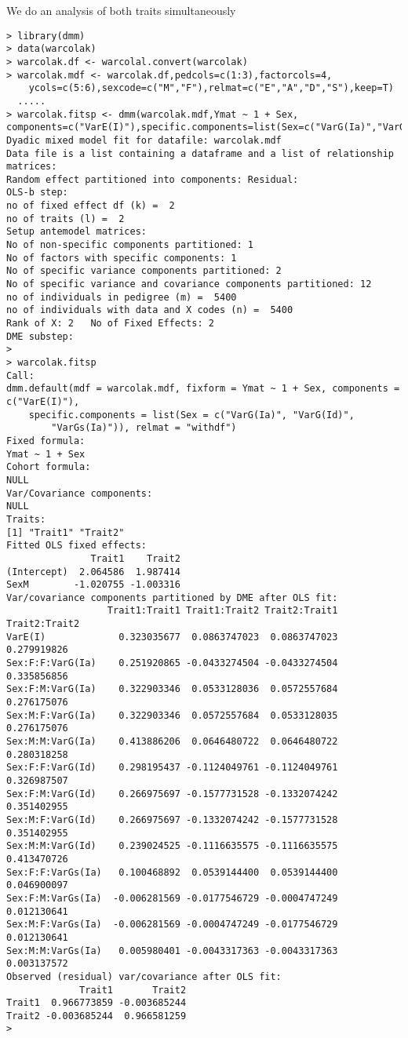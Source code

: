 \documentclass[titlepage]{article}  %
\begin{document}
We do an analysis of both traits simultaneously
\begin{verbatim}
> library(dmm)
> data(warcolak)
> warcolak.df <- warcolal.convert(warcolak)
> warcolak.mdf <- warcolak.df,pedcols=c(1:3),factorcols=4,
    ycols=c(5:6),sexcode=c("M","F"),relmat=c("E","A","D","S"),keep=T)
  .....
> warcolak.fitsp <- dmm(warcolak.mdf,Ymat ~ 1 + Sex, components=c("VarE(I)"),specific.components=list(Sex=c("VarG(Ia)","VarG(Id)","VarGs(Ia)")),relmat="withdf")
Dyadic mixed model fit for datafile: warcolak.mdf  
Data file is a list containing a dataframe and a list of relationship matrices:
Random effect partitioned into components: Residual:
OLS-b step:
no of fixed effect df (k) =  2 
no of traits (l) =  2 
Setup antemodel matrices:
No of non-specific components partitioned: 1 
No of factors with specific components: 1 
No of specific variance components partitioned: 2 
No of specific variance and covariance components partitioned: 12 
no of individuals in pedigree (m) =  5400 
no of individuals with data and X codes (n) =  5400 
Rank of X: 2   No of Fixed Effects: 2 
DME substep:
>
> warcolak.fitsp
Call:
dmm.default(mdf = warcolak.mdf, fixform = Ymat ~ 1 + Sex, components = c("VarE(I)"), 
    specific.components = list(Sex = c("VarG(Ia)", "VarG(Id)", 
        "VarGs(Ia)")), relmat = "withdf")
Fixed formula:
Ymat ~ 1 + Sex
Cohort formula:
NULL
Var/Covariance components:
NULL
Traits:
[1] "Trait1" "Trait2"
Fitted OLS fixed effects:
               Trait1    Trait2
(Intercept)  2.064586  1.987414
SexM        -1.020755 -1.003316
Var/covariance components partitioned by DME after OLS fit:
                  Trait1:Trait1 Trait1:Trait2 Trait2:Trait1 Trait2:Trait2
VarE(I)             0.323035677  0.0863747023  0.0863747023   0.279919826
Sex:F:F:VarG(Ia)    0.251920865 -0.0433274504 -0.0433274504   0.335856856
Sex:F:M:VarG(Ia)    0.322903346  0.0533128036  0.0572557684   0.276175076
Sex:M:F:VarG(Ia)    0.322903346  0.0572557684  0.0533128035   0.276175076
Sex:M:M:VarG(Ia)    0.413886206  0.0646480722  0.0646480722   0.280318258
Sex:F:F:VarG(Id)    0.298195437 -0.1124049761 -0.1124049761   0.326987507
Sex:F:M:VarG(Id)    0.266975697 -0.1577731528 -0.1332074242   0.351402955
Sex:M:F:VarG(Id)    0.266975697 -0.1332074242 -0.1577731528   0.351402955
Sex:M:M:VarG(Id)    0.239024525 -0.1116635575 -0.1116635575   0.413470726
Sex:F:F:VarGs(Ia)   0.100468892  0.0539144400  0.0539144400   0.046900097
Sex:F:M:VarGs(Ia)  -0.006281569 -0.0177546729 -0.0004747249   0.012130641
Sex:M:F:VarGs(Ia)  -0.006281569 -0.0004747249 -0.0177546729   0.012130641
Sex:M:M:VarGs(Ia)   0.005980401 -0.0043317363 -0.0043317363   0.003137572
Observed (residual) var/covariance after OLS fit:
             Trait1       Trait2
Trait1  0.966773859 -0.003685244
Trait2 -0.003685244  0.966581259
> 
\end{verbatim}
\end{document}
